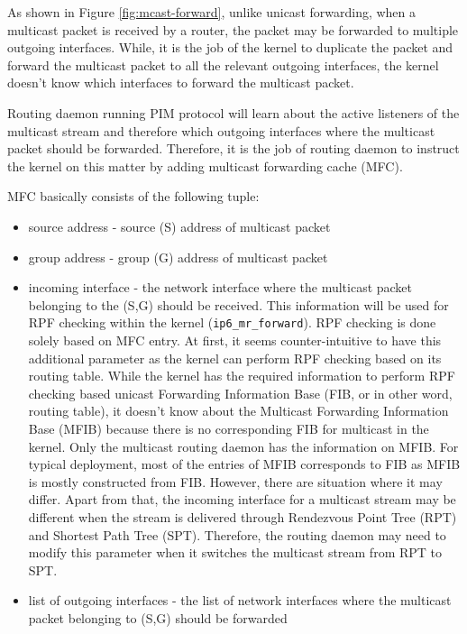 \documentclass{article}
\begin{document}
As shown in Figure \ref{fig:mcast-forward}, unlike unicast forwarding, when a
multicast packet is received by a router, the packet may be forwarded to
multiple outgoing interfaces. While, it is the job of the kernel to duplicate
the packet and forward the multicast packet to all the relevant outgoing
interfaces, the kernel doesn't know which interfaces to forward the multicast
packet. 

Routing daemon running PIM protocol will learn about the active listeners of the
multicast stream and therefore which outgoing interfaces where the multicast
packet should be forwarded. Therefore, it is the job of routing daemon to
instruct the kernel on this matter by adding multicast forwarding cache (MFC).

MFC basically consists of the following tuple:
\begin{itemize}
  \item source address - source (S) address of multicast packet
  \item group address - group (G) address of multicast packet
  \item incoming interface - the network interface where the multicast packet
  belonging to the (S,G) should be received. This information will be used for
  RPF checking within the kernel (\texttt{ip6\_mr\_forward}). RPF checking is
  done solely based on MFC entry. At first, it seems counter-intuitive to have
  this additional parameter as the kernel can perform RPF checking based on its
  routing table.  While the kernel has the required information to perform RPF
  checking based unicast Forwarding Information Base (FIB, or in other word,
  routing table), it doesn't know about the Multicast Forwarding Information
  Base (MFIB) because there is no corresponding FIB for multicast in the kernel.
  Only the multicast routing daemon has the information on MFIB. For typical
  deployment, most of the entries of MFIB corresponds to FIB as MFIB is mostly
  constructed from FIB. However, there are situation where it may differ. Apart
  from that, the incoming interface for a multicast stream may be different when
  the stream is delivered through Rendezvous Point Tree (RPT) and Shortest Path
  Tree (SPT). Therefore, the routing daemon may need to modify this parameter when
  it switches the multicast stream from RPT to SPT.
  \item list of outgoing interfaces - the list of network interfaces where the
  multicast packet belonging to (S,G) should be forwarded 
\end{itemize}
\end{document}
